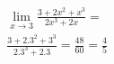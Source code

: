 \begin{ex}
\begin{align}
&\lim_{x\rightarrow 3} \frac{3+2x^2+x^3}{2x^3+2x}=\nonumber\\
&\frac{3+2.3^2+3^3}{2.3^3+2.3}=\frac{48}{60}=\frac{4}{5}\nonumber
\end{align}
\end{ex}
